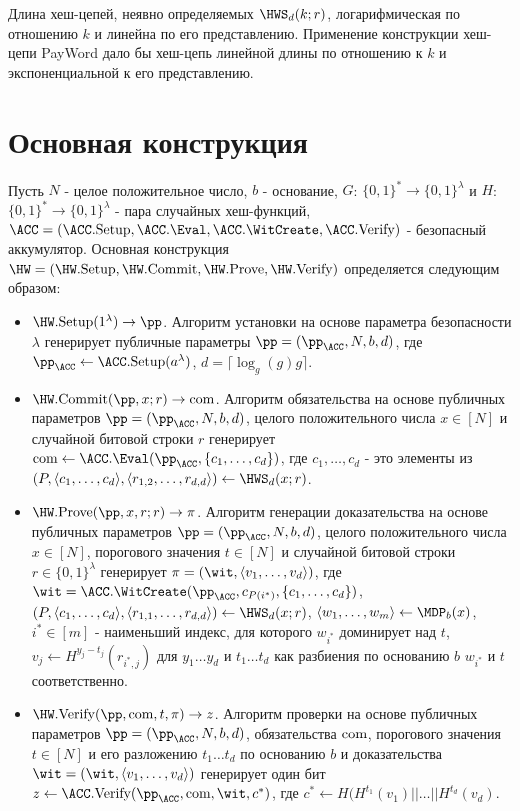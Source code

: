 Длина хеш-цепей, неявно определяемых $\HWS_d(k; r)$, логарифмическая по отношению $k$ и линейна по его представлению.
Применение конструкции хеш-цепи PayWord \cite{10.1007/3-540-62494-5_6} дало бы хеш-цепь линейной длины по отношению к $k$ и экспоненциальной к его представлению.

\section{Основная конструкция} %
\begin{definition}
	Пусть $N$ - целое положительное число, $b$ - основание, $G$: $\{0, 1\}^* \rightarrow \{0, 1\}^\lambda$ и $H$: $\{0, 1\}^* \rightarrow \{0, 1\}^\lambda$ - пара случайных хеш-функций, $\ACC = (\ACC.\Setup, \ACC.\Eval, \ACC.\WitCreate, \ACC.\Verify)$ - безопасный аккумулятор.
	Основная конструкция $\HW = (\HW.\Setup, \HW.\Commit, \HW.\Prove, \HW.\Verify)$ определяется следующим образом:
	\begin{itemize}
		\item $\HW.\Setup(1^\lambda) \rightarrow \pp$. Алгоритм установки на основе параметра безопасности $\lambda$ генерирует публичные параметры $\pp = (\pp_\ACC, N, b, d)$, где $\pp_\ACC \leftarrow \ACC.\Setup(a^\lambda)$, $d = \lceil \log_g(g)g\rceil$.
		\item $\HW.\Commit(\pp, x; r) \rightarrow \com$. Алгоритм обязательства на основе публичных параметров $\pp = (\pp_\ACC, N, b, d)$, целого положительного числа $x \in [N]$ и случайной битовой строки $r$ генерирует $\com \leftarrow \ACC.\Eval(\pp_\ACC, \{c_1, \dots, c_d\})$, где $c_1, \dots, c_d$ - это элементы из $(P, \langle c_1, \dots, c_d \rangle, \langle r_{1, 2}, \dots, r_{d, d} \rangle) \leftarrow \HWS_d(x; r)$.
		\item $\HW.\Prove(\pp, x, r; r) \rightarrow \pi$. Алгоритм генерации доказательства на основе публичных параметров $\pp = (\pp_\ACC, N, b, d)$, целого положительного числа $x \in [N]$, порогового значения $t \in [N]$ и случайной битовой строки $r \in \{0, 1\}^\lambda$ генерирует $\pi = (\wit, \langle v_1, \dots, v_d \rangle)$, где $\wit = \ACC.\WitCreate(\pp_\ACC, c_{P(i^*)}, \{c_1, \dots, c_d\})$, $(P, \langle c_1, \dots, c_d \rangle, \langle r_{1, 1}, \dots, r_{d, d} \rangle) \leftarrow \HWS_d(x; r)$, $\langle w_1, \dots, w_m \rangle \leftarrow \MDP_b(x)$, $i^* \in [m]$ - наименьший индекс, для которого $w_{i^*}$ доминирует над $t$, $v_j \leftarrow H^{y_j - t_j}(r_{i^*, j})$ для $y_1 \dots y_d$ и $t_1 \dots t_d$ как разбиения по основанию $b$ $w_{i^*}$ и $t$ соответственно.
		\item $\HW.\Verify(\pp, \com, t, \pi) \rightarrow z$. Алгоритм проверки на основе публичных параметров $\pp = (\pp_\ACC, N, b, d)$, обязательства $\text{com}$, порогового значения $t \in [N]$ и его разложению $t_1 \dots t_d$ по основанию $b$ и доказательства $\wit = (\wit, \langle v_1, \dots, v_d \rangle)$ генерирует один бит $z \leftarrow \ACC.\Verify(\pp_\ACC, \com, \wit, c^*)$, где $c^* \leftarrow H(H^{t_1}(v_1) || \dots || H^{t_d}(v_d)$.
	\end{itemize}
\end{definition}


